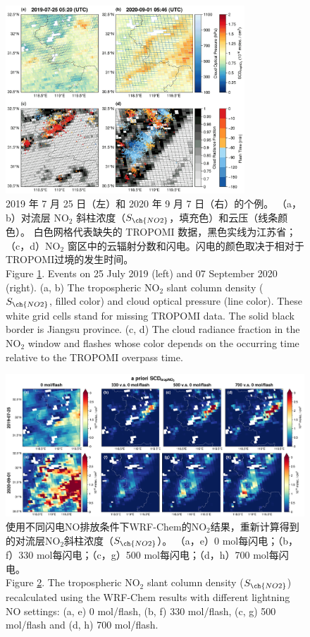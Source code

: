 \begin{figure}[H]
    \centering
    \includegraphics[width=0.8\textwidth]{./figures/china_flash_scd.png}
    \caption{
    2019 年 7 月 25 日（左）和 2020 年 9 月 7 日（右）的个例。
    （a，b）对流层 NO$_2$ 斜柱浓度（$S_{\ch{NO2}}$，填充色）和云压（线条颜色）。
    白色网格代表缺失的 TROPOMI 数据，黑色实线为江苏省；
    （c，d）NO$_2$ 窗区中的云辐射分数和闪电。闪电的颜色取决于相对于TROPOMI过境的发生时间。\\
    Figure \ref{fig:china_flash_scd}. Events on 25 July 2019 (left) and 07 September 2020 (right).
    (a, b) The tropospheric NO$_2$ slant column density ($S_{\ch{NO2}}$, filled color) and cloud optical pressure (line color).
    These white grid cells stand for missing TROPOMI data.
    The solid black border is Jiangsu province.
    (c, d) The cloud radiance fraction in the NO$_2$ window and flashes whose color depends on the occurring time relative to the TROPOMI overpass time.
    }
    \label{fig:china_flash_scd}
\end{figure}


\begin{figure}
    \centering
    \includegraphics[width=0.85\columnwidth]{./figures/s5p_apriori_scd.png}
    \caption{使用不同闪电NO排放条件下WRF-Chem的NO$_2$结果，重新计算得到的对流层NO$_2$斜柱浓度（$S_{\ch{NO2}}$）。
    （a，e）0 mol每闪电；（b，f）330 mol每闪电；（c，g）500 mol每闪电；（d，h）700 mol每闪电。\\
    Figure \ref{fig:s5p_apriori_scd}. The tropospheric NO$_2$ slant column density ($S_{\ch{NO2}}$) recalculated using the WRF-Chem results with different lightning NO settings: (a, e) 0 mol/flash, (b, f) 330 mol/flash, (c, g) 500 mol/flash and (d, h) 700 mol/flash.
    }
    \label{fig:s5p_apriori_scd}
\end{figure}
\FloatBarrier

